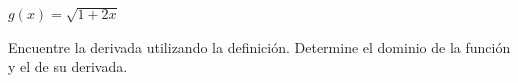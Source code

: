 \item $g(x) = \sqrt{1 + 2x}$
\par
Encuentre la derivada utilizando la definición. Determine el dominio de la función y el de su derivada.

